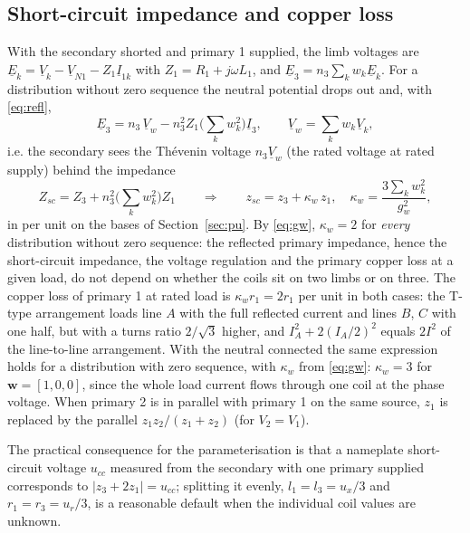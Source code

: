 \documentclass[10pt,a4paper]{scrartcl}
\newcommand{\ph}[1]{\underline{#1}}
\newcommand{\vect}[1]{\boldsymbol{#1}}
\begin{document}
\begin{onehalfspace}
\subsection{Short-circuit impedance and copper loss}

With the secondary shorted and primary 1 supplied, the limb voltages are $\ph{E}_k = \ph{V}_k - \ph{V}_{N1} - Z_1\ph{I}_{1k}$ with $Z_1 = R_1 + j\omega L_1$, and $\ph{E}_3 = n_3\sum_k w_k\ph{E}_k$. For a distribution without zero sequence the neutral potential drops out and, with \eqref{eq:refl},
\begin{equation}
\ph{E}_3 = n_3\,\ph{V}_w - n_3^2 Z_1 \Big(\sum_k w_k^2\Big)\ph{I}_3 , \qquad \ph{V}_w = \sum_k w_k \ph{V}_k ,
\end{equation}
i.e. the secondary sees the Th\'evenin voltage $n_3\ph{V}_w$ (the rated voltage at rated supply) behind the impedance
\begin{equation}
Z_{sc} = Z_3 + n_3^2\Big(\sum_k w_k^2\Big) Z_1
\qquad\Longrightarrow\qquad
z_{sc} = z_3 + \kappa_w\, z_1 , \quad \kappa_w = \frac{3\sum_k w_k^2}{g_w^2} ,
\label{eq:zsc}
\end{equation}
in per unit on the bases of Section~\ref{sec:pu}. By \eqref{eq:gw}, $\kappa_w = 2$ for \emph{every} distribution without zero sequence: the reflected primary impedance, hence the short-circuit impedance, the voltage regulation and the primary copper loss at a given load, do not depend on whether the coils sit on two limbs or on three. The copper loss of primary 1 at rated load is $\kappa_w r_1 = 2r_1$ per unit in both cases: the T-type arrangement loads line $A$ with the full reflected current and lines $B$, $C$ with one half, but with a turns ratio $2/\sqrt3$ higher, and $I_A^2 + 2(I_A/2)^2$ equals $2I^2$ of the line-to-line arrangement. With the neutral connected the same expression holds for a distribution with zero sequence, with $\kappa_w$ from \eqref{eq:gw}: $\kappa_w = 3$ for $\vect{w}=[1,0,0]$, since the whole load current flows through one coil at the phase voltage. When primary 2 is in parallel with primary 1 on the same source, $z_1$ is replaced by the parallel $z_1 z_2/(z_1+z_2)$ (for $V_2 = V_1$).

The practical consequence for the parameterisation is that a nameplate short-circuit voltage $u_{cc}$ measured from the secondary with one primary supplied corresponds to $|z_3 + 2z_1| = u_{cc}$; splitting it evenly, $l_1 = l_3 = u_x/3$ and $r_1 = r_3 = u_r/3$, is a reasonable default when the individual coil values are unknown.


\end{onehalfspace}
\end{document}
